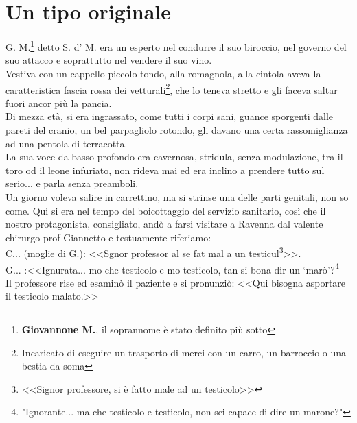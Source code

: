 
\chapter{Un tipo originale} 
G. M.\footnote{\textbf{Giovannone M.}, il soprannome è stato definito più sotto} detto S. d' M. era un esperto nel condurre il suo biroccio, nel governo del suo attacco e soprattutto nel vendere il suo vino. \\
\indent Vestiva con un cappello piccolo tondo, alla romagnola, alla cintola aveva la caratteristica fascia rossa dei vetturali\footnote{Incaricato di eseguire un trasporto di merci con un carro, un barroccio o una bestia da soma}, che lo teneva stretto e gli faceva saltar fuori ancor più la pancia.\\
\indent Di mezza età, si era ingrassato, come tutti i corpi sani, guance sporgenti dalle pareti del cranio, un bel parpagliolo rotondo, gli davano una certa rassomiglianza ad una pentola di terracotta.\\
\indent La sua voce da basso profondo era cavernosa, stridula, senza modulazione, tra il toro od il leone infuriato, non rideva mai ed era inclino a prendere tutto sul serio... e parla senza preamboli.\\
\indent Un giorno voleva salire in carrettino, ma si strinse una delle parti genitali, non so come. Qui si era nel tempo del boicottaggio del servizio sanitario, così che il nostro protagonista, consigliato, andò a farsi visitare a Ravenna dal valente chirurgo prof Giannetto e testuamente riferiamo:\\
\indent {}C\:.\:.\:. (moglie di G.): <<Sgnor professor al se fat mal a un testicul\footnote{<<Signor professore, si è fatto male ad un testicolo>>}>>.\\
\indent G\:.\:.\:. :<<Ignurata... mo che testicolo e mo testicolo, tan si bona dir un `marò'?\footnote{"Ignorante... ma che testicolo e testicolo, non sei capace di dire un marone?"}\\
\indent Il professore rise ed esaminò il paziente e si pronunziò: <<Qui bisogna asportare il testicolo malato.>>\\
